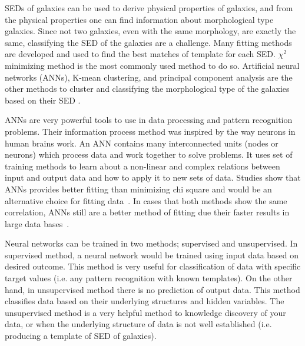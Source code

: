 SEDs of galaxies can be used to derive physical properties of galaxies, and from the physical properties one can find information about morphological type  galaxies.
Since not two galaxies, even with the same morphology, are exactly the same, classifying the SED of the galaxies are a challenge.
Many fitting methods are developed and used to find the best matches of template for each SED.
$\chi^2$ minimizing method is the most commonly used method to do so. 
Artificial neural networks (ANNs), K-mean clustering, and principal component analysis are the other methods to cluster and classifying the morphological type of the galaxies based on their SED \citep[e.g.][]{Allen13,Ordov14,Shi15}.

ANNs are very powerful tools to use in data processing and pattern recognition problems.
Their information process method was inspired by the way neurons in human brains work.
An ANN contains many interconnected units (nodes or neurons) which process data and work together to solve problems.
It uses set of training methods to learn about a non-linear and complex relations between input and output data and how to apply it to new sets of data.
Studies show that ANNs provides better fitting than minimizing chi square and would be an alternative choice for fitting data~\citep[e.g.][]{Marquez91,Moayed09}.
In cases that both methods show the same correlation, ANNs still are a better method of fitting due their faster results in large data bases~\citep[][]{Gulati97}.

Neural networks can be trained in two methods; supervised and unsupervised.
In supervised method, a neural network would be trained using input data based on desired outcome.
This method is very useful for classification of data with specific target values (i.e. any pattern recognition with known templates).
On the other hand, in unsupervised method there is no prediction of output data.
This method classifies data based on their underlying structures and hidden variables.
The unsupervised method is a very helpful method to knowledge discovery of your data, or when the underlying structure of data is not well established (i.e. producing a template of SED of galaxies).

